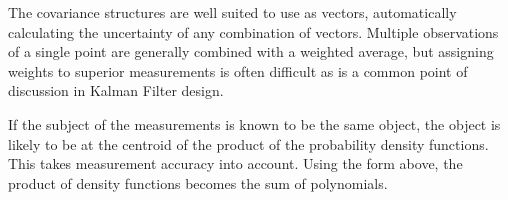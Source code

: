 \documentclass{article}
\newcounter{subsubsubsection}[subsubsection]
\begin{document}
      \label{sec:covarInter}
        The covariance structures are well suited to use as vectors, automatically calculating the uncertainty of any combination of vectors. 
        Multiple observations of a single point are generally combined with a weighted average, but assigning weights to superior measurements is often difficult as is a common point of discussion in Kalman Filter design.
        
        If the subject of the measurements is known to be the same object, the object is likely to be at the centroid of the product of the probability density functions.  This takes measurement accuracy into account.
        Using the form above, the product of density functions becomes the sum of polynomials.
\end{document}
